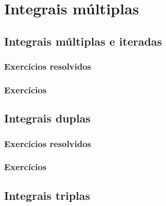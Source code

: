 
\chapter{Integrais múltiplas}\label{chap:integ}
\emconstrucao

\section{Integrais múltiplas e iteradas}

\subsection*{Exercícios resolvidos}
\construirExeresol

\subsection*{Exercícios}
\construirExer


\section{Integrais duplas}

\subsection*{Exercícios resolvidos}
\construirExeresol

\subsection*{Exercícios}
\construirExer


\section{Integrais triplas}

